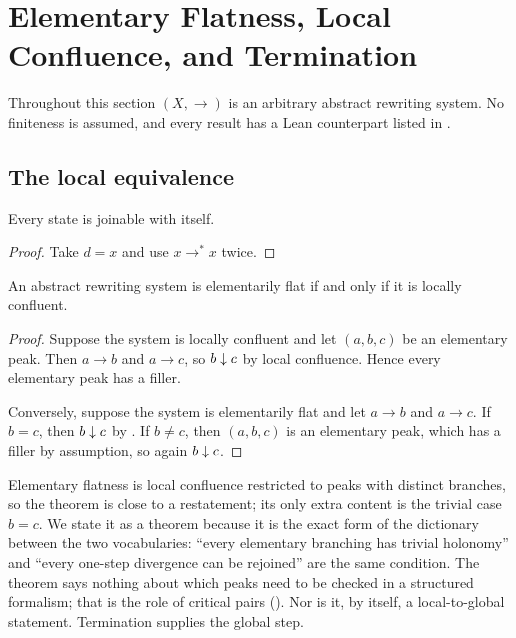\section{Elementary Flatness, Local Confluence, and Termination}
\label{sec:core-theorem}

Throughout this section $(X,\to)$ is an arbitrary abstract rewriting system. No finiteness is assumed, and every result has a Lean counterpart listed in .

\subsection{The local equivalence}

\begin{lemma}
\label{lem:joinable-refl}
Every state is joinable with itself.
\end{lemma}

\begin{proof}
Take $d = x$ and use $x \to^{*} x$ twice.
\end{proof}

\begin{theorem}
\label{thm:elementary-flatness-iff-local-confluence}
An abstract rewriting system is elementarily flat if and only if it is locally confluent.
\end{theorem}

\begin{proof}
Suppose the system is locally confluent and let $(a,b,c)$ be an elementary peak. Then $a \to b$ and $a \to c$, so $b \mathrel{\downarrow} c$ by local confluence. Hence every elementary peak has a filler.

Conversely, suppose the system is elementarily flat and let $a \to b$ and $a \to c$. If $b = c$, then $b \mathrel{\downarrow} c$ by . If $b \neq c$, then $(a,b,c)$ is an elementary peak, which has a filler by assumption, so again $b \mathrel{\downarrow} c$.
\end{proof}

\begin{remark}
\label{rem:core-theorem-scope}
Elementary flatness is local confluence restricted to peaks with distinct branches, so the theorem is close to a restatement; its only extra content is the trivial case $b = c$. We state it as a theorem because it is the exact form of the dictionary between the two vocabularies: ``every elementary branching has trivial holonomy'' and ``every one-step divergence can be rejoined'' are the same condition. The theorem says nothing about which peaks need to be checked in a structured formalism; that is the role of critical pairs (). Nor is it, by itself, a local-to-global statement. Termination supplies the global step.
\end{remark}

